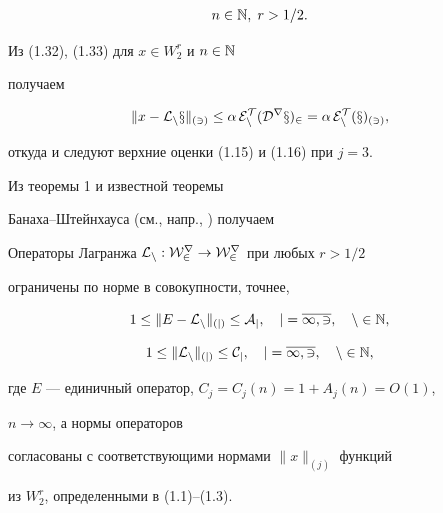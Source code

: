 \begin{pf}
\begin{gather}
n\in \Bbb{N},\; r>1/2 .


\end{gather}





Из (1.32), (1.33) для $x\in W_2^r$ и $n\in \Bbb{N}$


получаем


\begin{equation}


\|x-\cal{L}_nx\|_{(3)}\le \alpha \, E_n^T(D^rx)_2=


\alpha \, E_n^T(x)_{(3)},


\end{equation}


откуда и следуют верхние оценки (1.15) и (1.16) при $j=3$.


\end{pf}





Из теоремы 1 и известной теоремы


Банаха--Штейнхауса (см., напр., \cite{Kant}) получаем 





\begin{cornonum}


Операторы Лагранжа $\cal L_n : W_2^r\to W_2^r$ при любых $r>1/2$


ограничены по норме в совокупности, точнее,


\begin{equation}


1\le \|E-\cal{L}_n\|_{(j)}\le A_j,\quad j=\overline{1,3},


\quad n\in \Bbb{N},


\end{equation}


%


\begin{equation}


1\le \|\cal{L}_n\|_{(j)}\le C_j,\quad j=\overline{1,3},


\quad n\in \Bbb{N},


\end{equation}


где $ E$ --- единичный оператор, $C_j=C_j(n)=1+A_j(n)=O(1)$,


$n\to \infty $, а нормы операторов


согласованы с соответствующими нормами $\|x\|_{(j)}$ функций


из $W_2^r$, определенными в (1.1)--(1.3).


\end{cornonum}





